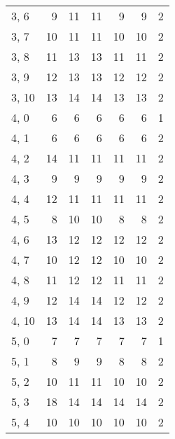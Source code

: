 \begin{table}
\begin{tabular}{lrrrrrr}
3, 6   &           9 &           11 &         11 &            9 &         9 &      2 \\
3, 7   &          10 &           11 &         11 &           10 &        10 &      2 \\
3, 8   &          11 &           13 &         13 &           11 &        11 &      2 \\
3, 9   &          12 &           13 &         13 &           12 &        12 &      2 \\
3, 10  &          13 &           14 &         14 &           13 &        13 &      2 \\
4, 0   &           6 &            6 &          6 &            6 &         6 &      1 \\
4, 1   &           6 &            6 &          6 &            6 &         6 &      2 \\
4, 2   &          14 &           11 &         11 &           11 &        11 &      2 \\
4, 3   &           9 &            9 &          9 &            9 &         9 &      2 \\
4, 4   &          12 &           11 &         11 &           11 &        11 &      2 \\
4, 5   &           8 &           10 &         10 &            8 &         8 &      2 \\
4, 6   &          13 &           12 &         12 &           12 &        12 &      2 \\
4, 7   &          10 &           12 &         12 &           10 &        10 &      2 \\
4, 8   &          11 &           12 &         12 &           11 &        11 &      2 \\
4, 9   &          12 &           14 &         14 &           12 &        12 &      2 \\
4, 10  &          13 &           14 &         14 &           13 &        13 &      2 \\
5, 0   &           7 &            7 &          7 &            7 &         7 &      1 \\
5, 1   &           8 &            9 &          9 &            8 &         8 &      2 \\
5, 2   &          10 &           11 &         11 &           10 &        10 &      2 \\
5, 3   &          18 &           14 &         14 &           14 &        14 &      2 \\
5, 4   &          10 &           10 &         10 &           10 &        10 &      2 \\

\end{tabular}
\end{table}
